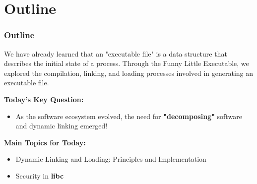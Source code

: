 

\section{Outline}

\begin{frame}
    \frametitle{Outline}

We have already learned that an "executable file" is a data structure that describes the initial state of a process. Through the Funny Little Executable, we explored the compilation, linking, and loading processes involved in generating an executable file.

    \textbf{Today's Key Question:}

    \begin{itemize}
        \item As the software ecosystem evolved, the need for \textbf{"decomposing"} software and dynamic linking emerged!
    \end{itemize}


    \vspace{15pt}

    \textbf{Main Topics for Today:}

    \begin{itemize}
        \item Dynamic Linking and Loading: Principles and Implementation
        \item Security in \textbf{libc}
    \end{itemize}

\end{frame}

